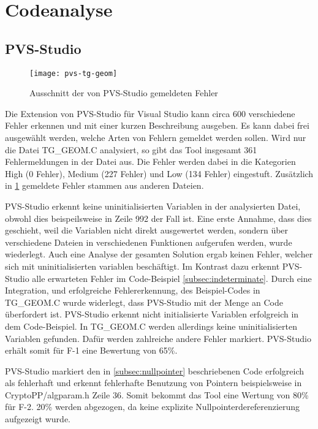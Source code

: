 \section{Codeanalyse}
\label{sec:codeanalyse}

\subsection{PVS-Studio}

\begin{figure}[htpb]
  \centering
  \texttt{[image: pvs-tg-geom]}
  \caption{Ausschnitt der von PVS-Studio gemeldeten Fehler}
  \label{img:pvs-tg-geom}
\end{figure}

Die Extension von PVS-Studio für Visual Studio kann circa 600 verschiedene Fehler erkennen und mit einer kurzen Beschreibung ausgeben. Es kann dabei frei ausgewählt werden, welche Arten von
Fehlern gemeldet werden sollen. \newline
Wird nur die Datei \glqq{}TG\_GEOM.C\grqq{} analysiert, so gibt das Tool insgesamt 361 Fehlermeldungen in der Datei aus. Die Fehler werden dabei in die Kategorien \glqq{}High\grqq{}
(0 Fehler), \glqq{}Medium\grqq{} (227 Fehler) und \glqq{}Low\grqq{} (134 Fehler) eingestuft. Zusätzlich in \ref{img:pvs-tg-geom} gemeldete Fehler stammen aus anderen Dateien.

PVS-Studio erkennt keine uninitialisierten Variablen in der analysierten Datei, obwohl dies beispeilsweise in Zeile 992 der Fall ist. Eine erste Annahme, dass dies geschieht, weil die
Variablen nicht direkt ausgewertet werden, sondern über verschiedene Dateien in verschiedenen Funktionen aufgerufen werden, wurde wiederlegt. Auch eine Analyse der gesamten Solution
ergab keinen Fehler, welcher sich mit uninitialisierten variablen beschäftigt. \newline
Im Kontrast dazu erkennt PVS-Studio alle erwarteten Fehler im Code-Beispiel \ref{subsec:indeterminate}. Durch eine Integration, und erfolgreiche Fehlererkennung, des Beispiel-Codes in
\glqq{}TG\_GEOM.C\grqq{} wurde widerlegt, dass PVS-Studio mit der Menge an Code überfordert ist. \newline
PVS-Studio erkennt nicht initialisierte Variablen erfolgreich in dem Code-Beispiel. In \glqq{}TG\_GEOM.C\grqq{} werden allerdings keine uninitialisierten Variablen gefunden. Dafür
werden zahlreiche andere Fehler markiert. PVS-Studio erhält somit für F-1 eine Bewertung von 65\%.

PVS-Studio markiert den in \ref{subsec:nullpointer} beschriebenen Code erfolgreich als fehlerhaft und erkennt fehlerhafte Benutzung von Pointern beispielsweise in
\glqq{}CryptoPP/algparam.h\grqq{} Zeile 36. Somit bekommt das Tool eine Wertung von 80\% für F-2. 20\% werden abgezogen, da keine explizite Nullpointerdereferenzierung
aufgezeigt wurde.

